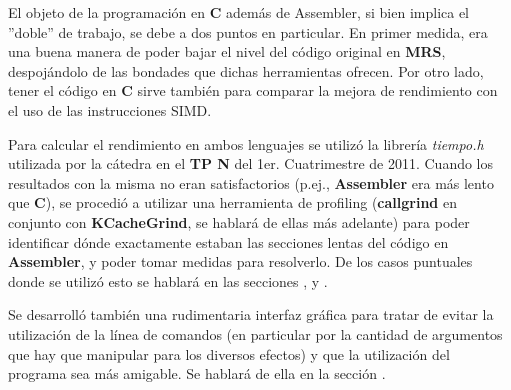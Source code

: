 El objeto de la programación en \textbf{C} además de Assembler, si bien implica el ''doble'' de trabajo, se debe a dos puntos en particular. En primer medida, era una buena manera de poder bajar el nivel del código original en \textbf{MRS}, despojándolo de las bondades que dichas herramientas ofrecen. Por otro lado, tener el código en \textbf{C} sirve también para comparar la mejora de rendimiento con el uso de las instrucciones SIMD. \vspace{\baselineskip}

Para calcular el rendimiento en ambos lenguajes se utilizó la librería \textit{tiempo.h} utilizada por la cátedra en el \textbf{TP N} del 1er. Cuatrimestre de 2011. Cuando los resultados con la misma no eran satisfactorios (p.ej., \textbf{Assembler} era más lento que \textbf{C}), se procedió a utilizar una herramienta de profiling (\textbf{callgrind} en conjunto con \textbf{KCacheGrind}, se hablará de ellas más adelante) para poder identificar dónde exactamente estaban las secciones lentas del código en \textbf{Assembler}, y poder tomar medidas para resolverlo. De los casos puntuales donde se utilizó esto se hablará en las secciones ,  y .\vspace{\baselineskip}

Se desarrolló también una rudimentaria interfaz gráfica para tratar de evitar la utilización de la línea de comandos (en particular por la cantidad de argumentos que hay que manipular para los diversos efectos) y que la utilización del programa sea más amigable. Se hablará de ella en la sección .
 
